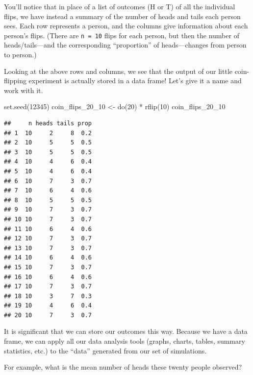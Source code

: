 \documentclass[
]{book}
\newenvironment{Shaded}{\begin{snugshade}}{\end{snugshade}}
\newcommand{\DecValTok}[1]{\textcolor[rgb]{0.00,0.00,0.81}{#1}}
\newcommand{\FunctionTok}[1]{\textcolor[rgb]{0.00,0.00,0.00}{#1}}
\newcommand{\NormalTok}[1]{#1}
\newcommand{\OtherTok}[1]{\textcolor[rgb]{0.56,0.35,0.01}{#1}}
\newcommand{\SpecialCharTok}[1]{\textcolor[rgb]{0.00,0.00,0.00}{#1}}
\begin{document}
You'll notice that in place of a list of outcomes (H or T) of all the individual flips, we have instead a summary of the number of heads and tails each person sees. Each row represents a person, and the columns give information about each person's flips. (There are \texttt{n\ =\ 10} flips for each person, but then the number of heads/tails---and the corresponding ``proportion'' of heads---changes from person to person.)

Looking at the above rows and columns, we see that the output of our little coin-flipping experiment is actually stored in a data frame! Let's give it a name and work with it.

\begin{Shaded}
\begin{Highlighting}[]
\FunctionTok{set.seed}\NormalTok{(}\DecValTok{12345}\NormalTok{)}
\NormalTok{coin\_flips\_20\_10 }\OtherTok{\textless{}{-}} \FunctionTok{do}\NormalTok{(}\DecValTok{20}\NormalTok{) }\SpecialCharTok{*} \FunctionTok{rflip}\NormalTok{(}\DecValTok{10}\NormalTok{)}
\NormalTok{coin\_flips\_20\_10}
\end{Highlighting}
\end{Shaded}

\begin{verbatim}
##     n heads tails prop
## 1  10     2     8  0.2
## 2  10     5     5  0.5
## 3  10     5     5  0.5
## 4  10     4     6  0.4
## 5  10     4     6  0.4
## 6  10     7     3  0.7
## 7  10     6     4  0.6
## 8  10     5     5  0.5
## 9  10     7     3  0.7
## 10 10     7     3  0.7
## 11 10     6     4  0.6
## 12 10     7     3  0.7
## 13 10     7     3  0.7
## 14 10     6     4  0.6
## 15 10     7     3  0.7
## 16 10     6     4  0.6
## 17 10     7     3  0.7
## 18 10     3     7  0.3
## 19 10     4     6  0.4
## 20 10     7     3  0.7
\end{verbatim}

It is significant that we can store our outcomes this way. Because we have a data frame, we can apply all our data analysis tools (graphs, charts, tables, summary statistics, etc.) to the ``data'' generated from our set of simulations.

For example, what is the mean number of heads these twenty people observed?

\begin{Shaded}
\end{Shaded}
\end{document}
